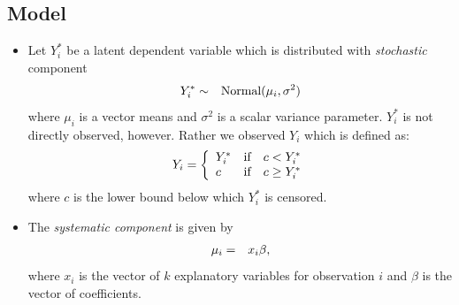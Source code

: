 \documentclass[letterpaper,10pt,english]{sphinxmanual}
\begin{document}
\subsection{Model}
\label{vignette:id61}\begin{itemize}
\item {} 
Let \(Y_i^*\) be a latent dependent variable which is distributed
with \emph{stochastic} component
\begin{gather}
\begin{split}\begin{aligned}
Y_i^* & \sim & \textrm{Normal}(\mu_i, \sigma^2) \\\end{aligned}\end{split}\notag
\end{gather}
where \(\mu_i\) is a vector means and \(\sigma^2\) is a
scalar variance parameter. \(Y_i^*\) is not directly observed,
however. Rather we observed \(Y_i\) which is defined as:
\begin{gather}
\begin{split}Y_i = \left\{
\begin{array}{lcl}
Y_i^*  &\textrm{if} & c <Y_i^* \\
c    &\textrm{if} & c \ge Y_i^*
\end{array}\right.\end{split}\notag
\end{gather}
where \(c\) is the lower bound below which \(Y_i^*\) is
censored.

\item {} 
The \emph{systematic component} is given by
\begin{gather}
\begin{split}\begin{aligned}
\mu_{i} &=& x_{i} \beta,\end{aligned}\end{split}\notag
\end{gather}
where \(x_{i}\) is the vector of \(k\) explanatory variables
for observation \(i\) and \(\beta\) is the vector of
coefficients.

\end{itemize}
\end{document}
